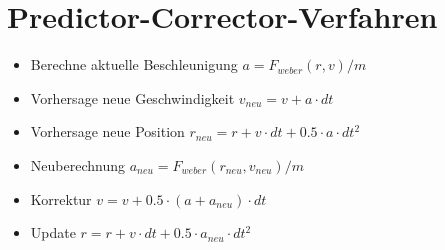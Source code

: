 \section{Predictor-Corrector-Verfahren}
\begin{itemize}
\item Berechne aktuelle Beschleunigung $a = F_{weber}(r, v) / m$
\item Vorhersage neue Geschwindigkeit $v_{neu} = v + a \cdot dt$
\item Vorhersage neue Position $r_{neu} = r + v \cdot dt + 0.5 \cdot a \cdot dt^2$
\item Neuberechnung $a_{neu} = F_{weber}(r_{neu}, v_{neu}) / m$
\item Korrektur $v = v + 0.5 \cdot (a + a_{neu}) \cdot dt$
\item Update $r = r + v \cdot dt + 0.5 \cdot a_{neu} \cdot dt^2$
\end{itemize}
